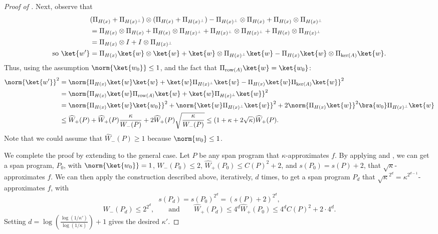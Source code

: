 \documentclass[11pt]{article}
\numberwithin{equation}{section}
\theoremstyle{definition}
\theoremstyle{plain}
\begin{document}
\begin{proof}[Proof of ]
Next, observe that
\begin{align*}
& (\Pi_{H(x)}+\Pi_{H(x)^\bot})\otimes(\Pi_{H(x)}+\Pi_{H(x)^\bot})-\Pi_{H(x)^\bot}\otimes\Pi_{H(x)}+\Pi_{H(x)}\otimes\Pi_{H(x)^\bot}\\
&=\Pi_{H(x)}\otimes \Pi_{H(x)}+\Pi_{H(x)}\otimes \Pi_{H(x)^\bot} + \Pi_{H(x)^\bot}\otimes \Pi_{H(x)^\bot}+\Pi_{H(x)}\otimes \Pi_{H(x)^\bot}\\
&=\Pi_{H(x)}\otimes I + I\otimes \Pi_{H(x)^\bot}\\
\mbox{so }\ket{w'} &=\Pi_{H(x)}\ket{w} \otimes \ket{w}+\ket{w}\otimes \Pi_{H(x)^\bot}\ket{w} - \Pi_{H(x)}\ket{w}\otimes \Pi_{\ker(A)}\ket{w}.
\end{align*}
Thus, using the assumption $\norm{\ket{w_0}}\leq 1$, and the fact that $\Pi_{\mathrm{row}(A)}\ket{w}=\ket{w_0}$:
\begin{align*}
\norm{\ket{w'}}^2 &= \norm{\Pi_{H(x)}\ket{w}\ket{w}+\ket{w}\Pi_{H(x)^\bot}\ket{w} - \Pi_{H(x)}\ket{w}\Pi_{\ker(A)}\ket{w}}^2\\
 &= \norm{\Pi_{H(x)}\ket{w}\Pi_{\mathrm{row}(A)}\ket{w}+\ket{w}\Pi_{H(x)^\bot}\ket{w}}^2\\
&=\norm{\Pi_{H(x)}\ket{w}\ket{w_0}}^2+\norm{\ket{w}\Pi_{H(x)^\bot}\ket{w}}^2 +2\norm{\Pi_{H(x)}\ket{w}}^2\bra{w_0}\Pi_{H(x)^\bot}\ket{w}\\
&\leq  \widehat{W}_+(P)+\widehat{W}_+(P)\frac{\kappa}{W_-(P)}+2\widehat{W}_+(P)\sqrt{\frac{\kappa}{W_-(P)}}
\leq  (1+\kappa+2\sqrt{\kappa})\widehat{W}_+(P).
\end{align*}
Note that we could assume that $\widehat{W}_-(P)\geq 1$ because $\norm{w_0}\leq 1$.


We complete the proof by extending to the general case. Let $P$ be any span program that $\kappa$-approximates $f$. By applying  and , we can get a span program, $P_0$, with $\norm{\ket{w_0}}=1$, ${W_-(P_0)}\leq 2$, $\widehat{W}_+(P_0)\leq C(P)^2+2$, and $s(P_0)=s(P)+2$, that $\sqrt{\kappa}$-approximates $f$. We can then apply the construction described above, iteratively, $d$ times, to get a span program $P_d$ that $\sqrt{\kappa}^{2^d}=\kappa^{2^{d-1}}$-approximates $f$, with
$$s(P_d)=s(P_0)^{2^d}=(s(P)+2)^{2^d},$$
$$W_-(P_d)\leq 2^{2^d},\qquad\mbox{and}\qquad 
\widehat{W}_+(P_d)\leq 4^d\widehat{W}_+(P_0)\leq 4^dC(P)^2+2\cdot 4^d.$$
Setting $d=\log\left(\frac{\log(1/\kappa')}{\log(1/\kappa)}\right)+1$ gives the desired $\kappa'$.
\end{proof}



%
\end{document}
